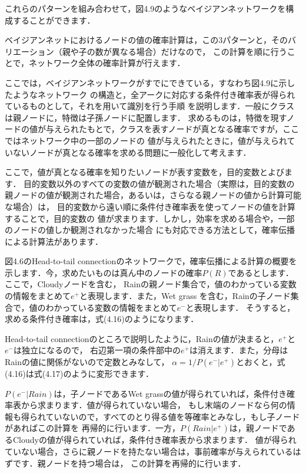 
これらのパターンを組み合わせて，図4.9のようなベイジアンネットワークを構成することができます．


ベイジアンネットにおけるノードの値の確率計算は，この3パターンと，そのバリエーション（親や子の数が異なる場合）だけなので，
この計算を順に行うことで，ネットワーク全体の確率計算が行えます．


ここでは，ベイジアンネットワークがすでにできている，すなわち図4.9に示したようなネットワーク
の構造と，全アークに対応する条件付き確率表が得られているものとして，それを用いて識別を行う手順
を説明します．一般にクラスは親ノードに，特徴は子孫ノードに配置します．
求めるものは，特徴を現すノードの値が与えられたもとで，クラスを表すノードが真となる確率ですが，ここではネットワーク中の一部のノードの
値が与えられたときに，値が与えられていないノードが真となる確率を求める問題に一般化して考えます．

ここで，値が真となる確率を知りたいノードが表す変数を，目的変数とよびます．
目的変数以外のすべての変数の値が観測された場合（実際は，目的変数の親ノードの値が観測された場合，あるいは，さらなる親ノードの値から計算可能な場合）は，
目的変数から遠い順に条件付き確率表を使ってノードの値を計算することで，目的変数の
値が求まります．しかし，効率を求める場合や，一部のノードの値しか観測されなかった場合
にも対応できる方法として，確率伝播による計算法があります．


図4.6のHead-to-tail connectionのネットワークで，確率伝播による計算の概要を
示します．今，求めたいものは真ん中のノードの確率$P(R)$であるとします．ここで，Cloudyノードを含む，
Rainの親ノード集合で，値のわかっている変数の情報をまとめて$e^+$と表現します．また，Wet grass
を含む，Rainの子ノード集合で，値のわかっている変数の情報をまとめて$e^-$と表現します．
そうすると，求める条件付き確率は，式(4.16)のようになります．


Head-to-tail connectionのところで説明したように，Rainの値が決まると，$e^+$と$e^-$は独立になるので，
右辺第一項の条件部中の$e^+$は消えます．また，分母はRainの値に関係がないので定数とみなして，
$\alpha = 1 / P(e^- \vert e^+)$とおくと，式(4.16)は式(4.17)のように変形できます．


$P(e^- \vert Rain)$は，子ノードであるWet grassの値が得られていれば，条件付き確率表から求まります．値が得られていない場合，
もし末端のノードなら何の情報も得られていないので，すべてのとり得る値を等確率とみなし，もし子ノードがあればこの計算を
再帰的に行います．一方，$P(Rain \vert e^+)$は，親ノードであるCloudyの値が得られていれば，条件付き確率表から求まります．
値が得られていない場合，さらに親ノードを持たない場合は，事前確率が与えられているはずです．親ノードを持つ場合は，
この計算を再帰的に行います．


